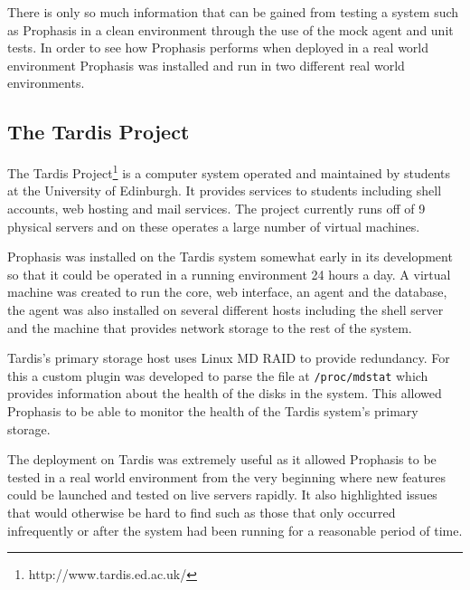 \documentclass[bsc,logo,twoside,parskip,singlespacing,notimes]{infthesis}
\begin{document}
	There is only so much information that can be gained from testing a system such
	as Prophasis in a clean environment through the use of the mock agent and unit
	tests.  In order to see how Prophasis performs when deployed in a real world
	environment Prophasis was installed and run in two different real world
	environments.

\subsection{The Tardis Project}
\label{testing-tardis}

	The Tardis Project\footnote{http://www.tardis.ed.ac.uk/} is a computer system
	operated and maintained by students at the University of Edinburgh.
	It provides services to students including shell accounts, web hosting and mail
	services.  The project currently runs off of 9 physical servers and on these
	operates a large number of virtual machines.


	Prophasis was installed on the Tardis system somewhat early in its development
	so that it could be operated in a running environment 24 hours a day. A virtual
	machine was created to run the core, web interface, an agent and the database,
	the agent was also installed on several different hosts including the shell
	server and the machine that provides network storage to the rest of the system.


	Tardis's primary storage host uses Linux MD RAID to provide redundancy.  For
	this a custom plugin was developed to parse the file at \texttt{/proc/mdstat}
	which provides information about the health of the disks in the system. This
	allowed Prophasis to be able to monitor the health of the Tardis system's
	primary storage.


	The deployment on Tardis was extremely useful as it allowed Prophasis to be
	tested in a real world environment from the very beginning where new features
	could be launched and tested on live servers rapidly.  It also highlighted
	issues that would otherwise be hard to find such as those that only occurred
	infrequently or after the system had been running for a reasonable period of
	time.
\end{document}
